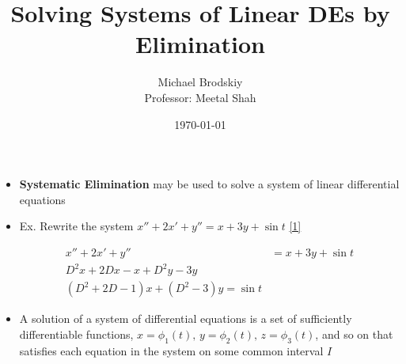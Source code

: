 \documentclass[12pt]{article}
\title{Solving Systems of Linear DEs by Elimination}
\date{\today}
\author{Michael Brodskiy\\ \small Professor: Meetal Shah}
\begin{document}
\maketitle

\begin{itemize}

  \item \textbf{Systematic Elimination} may be used to solve a system of linear differential equations

  \item Ex. Rewrite the system $x''+2x'+y''=x+3y+\sin t$ \eqref{1}

    \begin{equation}
      \begin{split}
       x''+2x'+y''&=x+3y+\sin t\\
       D^2x+2Dx-x+D^2y-3y\\
       (D^2+2D-1)x+(D^2-3)y=\sin t
      \end{split}
      \label{1}
    \end{equation}

  \item A solution of a system of differential equations is a set of sufficiently differentiable functions, $x=\phi_1(t),\, y=\phi_2(t),\, z=\phi_3(t)$, and so on that satisfies each equation in the system on some common interval $I$

\end{itemize}
\end{document}
